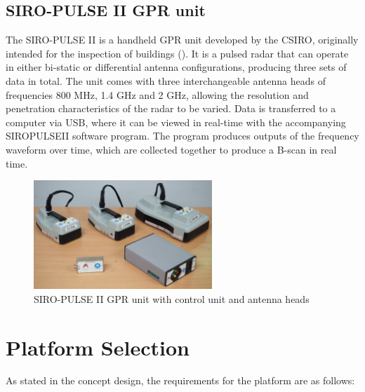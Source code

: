 \documentclass[main.tex]{subfiles}
\begin{document}
\begin{appendices}
\section{SIRO-PULSE II GPR unit}
The SIRO-PULSE II is a handheld GPR unit developed by the CSIRO, originally intended for the inspection of buildings (). It is a pulsed radar that can operate in either bi-static or differential antenna configurations, producing three sets of data in total. The unit comes with three interchangeable antenna heads of frequencies 800 MHz, 1.4 GHz and 2 GHz, allowing the resolution and penetration characteristics of the radar to be varied. Data is transferred to a computer via USB, where it can be viewed in real-time with the accompanying SIROPULSEII software program. The program produces outputs of the frequency waveform over time, which are collected together to produce a B-scan in real time. 

\begin{figure}[ht]
\includegraphics[width=0.6\textwidth]{3-ConceptDesign/SiroPulse.JPG}
\centering
\caption{SIRO-PULSE II GPR unit with control unit and antenna heads} 
\end{figure}

\chapter{Platform Selection}
As stated in the concept design, the requirements for the platform are as follows: 


\end{appendices}
\end{document}
